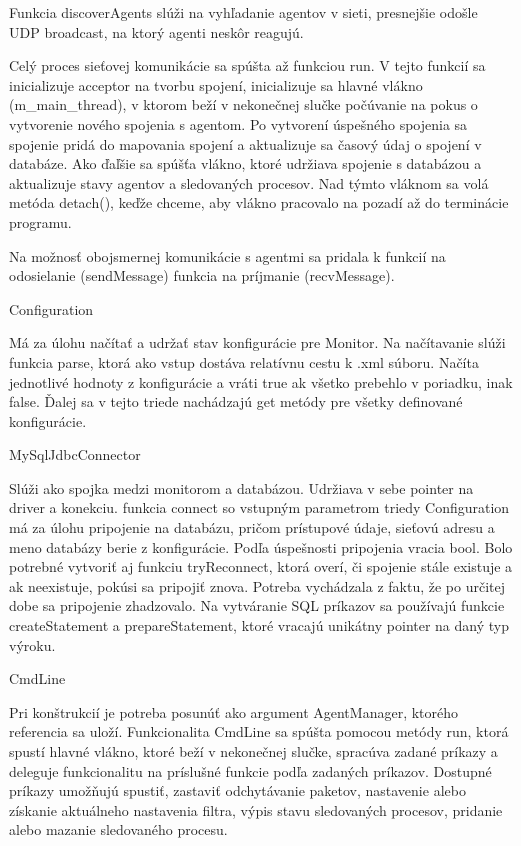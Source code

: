 \documentclass[a4paper,12pt]{article}
\begin{document}
Funkcia discoverAgents slúži na vyhľadanie agentov v sieti, presnejšie odošle UDP broadcast, na ktorý agenti neskôr reagujú.

Celý proces sieťovej komunikácie sa spúšta až funkciou run. V tejto funkcií sa inicializuje acceptor na tvorbu spojení, inicializuje sa hlavné vlákno (m\_main\_thread), v ktorom beží v nekonečnej slučke počúvanie na pokus o vytvorenie nového spojenia s agentom. Po vytvorení úspešného spojenia sa spojenie pridá do mapovania spojení a aktualizuje sa časový údaj o spojení v databáze. Ako ďaľšie sa spúšťa vlákno, ktoré udržiava spojenie s databázou a aktualizuje stavy agentov a sledovaných procesov. Nad týmto vláknom sa volá metóda detach(), keďže chceme, aby vlákno pracovalo na pozadí až do terminácie programu.

Na možnosť obojsmernej komunikácie s agentmi sa pridala k funkcií na odosielanie (sendMessage) funkcia na príjmanie (recvMessage).

Configuration

Má za úlohu načítať a udržať stav konfigurácie pre Monitor. Na načítavanie slúži funkcia parse, ktorá ako vstup dostáva relatívnu cestu k .xml súboru. Načíta jednotlivé hodnoty z konfigurácie a vráti true ak všetko prebehlo v poriadku, inak false. Ďalej sa v tejto triede nachádzajú get metódy pre všetky definované konfigurácie.

MySqlJdbcConnector

Slúži ako spojka medzi monitorom a databázou. Udržiava v sebe pointer na driver a konekciu. funkcia connect so vstupným parametrom triedy Configuration má za úlohu pripojenie na databázu, pričom prístupové údaje, sieťovú adresu a meno databázy berie z konfigurácie. Podľa úspešnosti pripojenia vracia bool. Bolo potrebné vytvoriť aj funkciu tryReconnect, ktorá overí, či spojenie stále existuje a ak neexistuje, pokúsi sa pripojiť znova. Potreba vychádzala z faktu, že po určitej dobe sa pripojenie zhadzovalo. Na vytváranie SQL príkazov sa používajú funkcie createStatement a prepareStatement, ktoré vracajú unikátny pointer na daný typ výroku. 

CmdLine

Pri konštrukcií je potreba posunúť ako argument AgentManager, ktorého referencia sa uloží. Funkcionalita CmdLine sa spúšta pomocou metódy run, ktorá spustí hlavné vlákno, ktoré beží v nekonečnej slučke, spracúva zadané príkazy a deleguje funkcionalitu na príslušné funkcie podľa zadaných príkazov. Dostupné príkazy umožňujú spustiť, zastaviť odchytávanie paketov, nastavenie alebo získanie aktuálneho nastavenia filtra, výpis stavu sledovaných procesov, pridanie alebo mazanie sledovaného procesu.  
\end{document}
